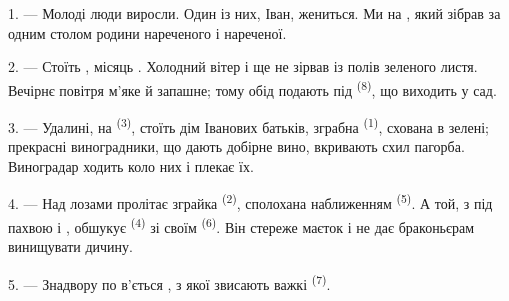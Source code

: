 %

\VUsaut{4.0mm}
\VUsaut{1.6mm}
\VUsaut{3.2mm}

\VUsaut{1.6mm}
\VUsaut{2.6mm}

\VUsaut{3.0mm}

1. --- Молоді люди виросли. Один із них, Іван, жениться. Ми на
, який зібрав за одним столом родини нареченого і
нареченої.

2. --- Стоїть , місяць . Холодний вітер
 і  ще не зірвав із полів зеленого листя.
Вечірнє повітря м'яке й запашне; тому обід подають під 
\textsuperscript{(8)}, що виходить у сад.

3. --- Удалині, на  \textsuperscript{(3)}, стоїть дім Іванових
батьків, зграбна  \textsuperscript{(1)}, схована в зелені;
прекрасні виноградники, що дають добірне вино, вкривають схил пагорба.
Виноградар ходить коло них і плекає їх.

4. --- Над лозами пролітає зграйка  \textsuperscript{(2)},
сполохана наближенням  \textsuperscript{(5)}. А той, з
 під пахвою і , обшукує
 \textsuperscript{(4)} зі своїм 
\textsuperscript{(6)}. Він стереже маєток і не дає браконьєрам винищувати
дичину.

5. --- Знадвору по  в'ється , з якої
звисають важкі  \textsuperscript{(7)}.

